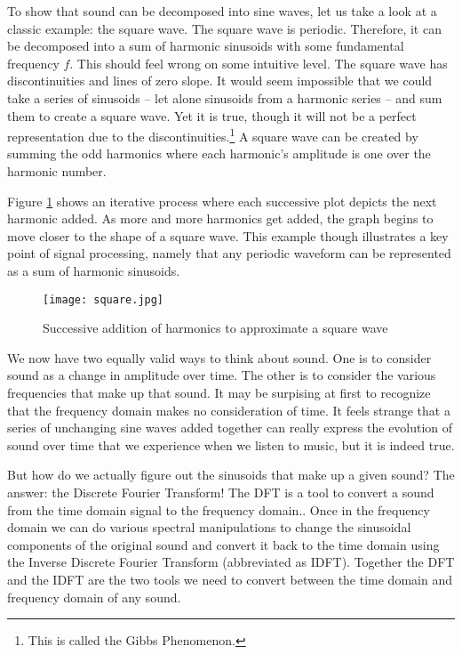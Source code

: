 To show that sound can be decomposed into sine waves, let us take a look at a classic example: the square wave.
The square wave is periodic.  Therefore, it can be decomposed into a sum of harmonic sinusoids with some 
fundamental frequency $f$.  This should feel wrong on some intuitive level.  The
square wave has discontinuities and lines of zero slope.  It would seem impossible that we could take a series of
sinusoids -- let alone sinusoids from a harmonic series -- and sum them to create a square wave.  Yet it is 
true, though it will not be a perfect representation due to the discontinuities.\footnote{This is called the Gibbs
	Phenomenon.} A square
wave can be created by summing the odd harmonics where each harmonic's amplitude is one over 
the harmonic number.

Figure \ref{fig:square} shows an iterative process where each successive plot depicts the next harmonic 
added.  As more and more harmonics get added, the graph begins to move closer to the shape of a square wave.  
This example though illustrates a key point of signal processing, namely that any
periodic waveform can be represented as a sum of harmonic sinusoids.  

\begin{figure}[h]
	\caption{Successive addition of harmonics to approximate a square wave}
	\label{fig:square}
	\begin{center}
		\texttt{[image: square.jpg]}
	\end{center}
\end{figure}

	We now have two  equally valid ways to think about sound.  One is to consider sound
as a change in amplitude over time.  The other is to consider the various frequencies that make up that sound.  It
may be surpising at first to recognize that the frequency domain makes no consideration of time.  It
feels strange that a series of unchanging sine waves added together can really express the evolution of
sound over time that we experience when we listen to music, but it is indeed true.
	
	But how do we actually figure out the sinusoids that make up a given sound?  The answer: the Discrete Fourier
Transform!  The DFT is a tool to convert a sound from the time domain signal to the frequency domain..  
Once in the frequency domain we can do various spectral manipulations
to change the sinusoidal components of the original sound and convert it back to the time domain using the
Inverse Discrete Fourier Transform (abbreviated as IDFT).  Together the DFT and the IDFT are the two
tools we need to convert between the time domain and frequency domain of any sound.

